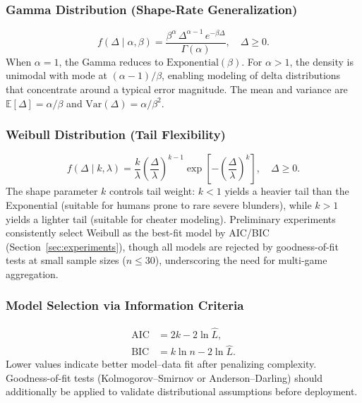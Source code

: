 \documentclass[11pt,a4paper]{article}
\newcommand{\E}{\mathbb{E}}
\begin{document}
\subsubsection{Gamma Distribution (Shape-Rate Generalization)}

\begin{equation}
    f(\Delta \mid \alpha, \beta) = \frac{\beta^{\alpha}\,
    \Delta^{\alpha - 1}\, e^{-\beta\Delta}}{\Gamma(\alpha)},
    \quad \Delta \geq 0.
    \label{eq:gamma_pdf}
\end{equation}
When $\alpha = 1$, the Gamma reduces to $\text{Exponential}(\beta)$.
For $\alpha > 1$, the density is unimodal with mode at
$(\alpha - 1)/\beta$, enabling modeling of delta distributions that
concentrate around a typical error magnitude. The mean and variance are
$\E[\Delta] = \alpha/\beta$ and $\text{Var}(\Delta) = \alpha/\beta^2$.

\subsubsection{Weibull Distribution (Tail Flexibility)}

\begin{equation}
    f(\Delta \mid k, \lambda) = \frac{k}{\lambda}
    \left(\frac{\Delta}{\lambda}\right)^{k-1}
    \exp\!\left[-\left(\frac{\Delta}{\lambda}\right)^{k}\right],
    \quad \Delta \geq 0.
    \label{eq:weibull_pdf}
\end{equation}
The shape parameter $k$ controls tail weight: $k < 1$ yields a heavier tail
than the Exponential (suitable for humans prone to rare severe blunders), while
$k > 1$ yields a lighter tail (suitable for cheater modeling). Preliminary
experiments consistently select Weibull as the best-fit model by AIC/BIC
(Section~\ref{sec:experiments}), though all models are rejected by
goodness-of-fit tests at small sample sizes ($n \leq 30$), underscoring the
need for multi-game aggregation.

\subsubsection{Model Selection via Information Criteria}
\label{sec:model_selection}

\begin{align}
    \text{AIC} &= 2k - 2\ln \hat{L}, \label{eq:aic}\\
    \text{BIC} &= k \ln n - 2\ln \hat{L}. \label{eq:bic}
\end{align}
Lower values indicate better model--data fit after penalizing complexity.
Goodness-of-fit tests (Kolmogorov--Smirnov or Anderson--Darling) should
additionally be applied to validate distributional assumptions before deployment.
\end{document}
